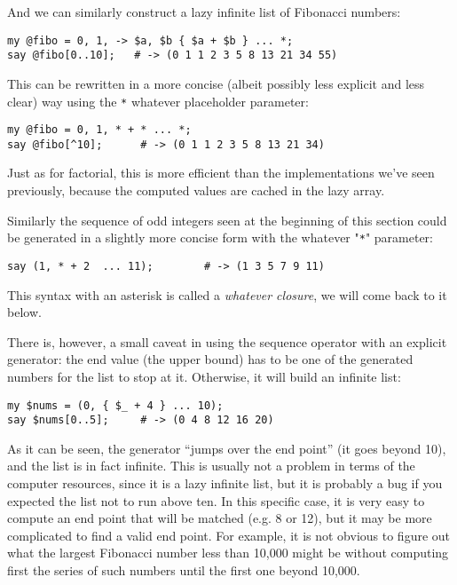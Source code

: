 And we can similarly construct a lazy infinite list of 
Fibonacci numbers:

\begin{verbatim}
my @fibo = 0, 1, -> $a, $b { $a + $b } ... *;
say @fibo[0..10];   # -> (0 1 1 2 3 5 8 13 21 34 55)
\end{verbatim}

This can be rewritten in a more concise (albeit possibly 
less explicit and less clear) way using the \verb'*' 
whatever placeholder parameter:

\begin{verbatim}
my @fibo = 0, 1, * + * ... *;
say @fibo[^10];      # -> (0 1 1 2 3 5 8 13 21 34)
\end{verbatim}

Just as for factorial, this is more efficient than the 
implementations we've seen previously, because the 
computed values are cached in the lazy array.

Similarly the sequence of odd integers seen at the 
beginning of this section could be generated in a 
slightly more concise form with the whatever "\verb'*'" 
parameter:

\begin{verbatim}
say (1, * + 2  ... 11);        # -> (1 3 5 7 9 11)
\end{verbatim}

This syntax with an asterisk is called a 
\emph{whatever closure}, we will come back to 
it below.

There is, however, a small caveat in using the sequence operator with 
an explicit generator: the end value (the upper bound) has 
to be one of the generated numbers for the list to stop at 
it. Otherwise, it will build an infinite list:

\begin{verbatim}
my $nums = (0, { $_ + 4 } ... 10);
say $nums[0..5];     # -> (0 4 8 12 16 20)
\end{verbatim}

As it can be seen, the generator ``jumps over the end 
point'' (it goes beyond 10), and the list is 
in fact infinite. This is usually not a problem 
in terms of the computer resources, since it is 
a lazy infinite list, but it is probably a bug if 
you expected the list not to run above ten. In this 
specific case, it is very easy to compute an end 
point that will be matched (e.g. 8 or 12), but it may be 
more complicated to find a valid end point. For example, 
it is not obvious to figure out what the largest 
Fibonacci number less than 10,000 might be without 
computing first the series of such numbers until the 
first one beyond 10,000.

